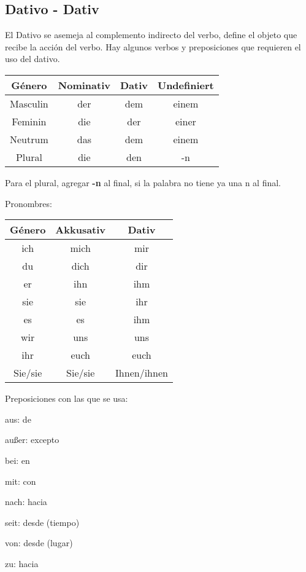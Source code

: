 \subsection{Dativo - Dativ}
El Dativo se asemeja al complemento indirecto del verbo, define el objeto que recibe la acción del verbo. Hay algunos verbos y preposiciones que requieren el uso del dativo.

\begin{tabular}{|c | c | c | c |}
\hline
\textbf{Género} & \textbf{Nominativ} & \textbf{Dativ} & \textbf{Undefiniert}\\
\hline
Masculin & der & dem & einem  \\
Feminin & die &  der & einer \\
Neutrum & das & dem & einem \\
Plural & die & den & -n \\
\hline
\end{tabular}

Para el plural, agregar \textbf{-n} al final, si la palabra no tiene ya una n al final.

Pronombres:

\begin{tabular}{|c | c | c |}
\hline
\textbf{Género} & \textbf{Akkusativ} & \textbf{Dativ} \\
\hline
ich & mich & mir \\
du & dich & dir \\
er & ihn & ihm \\
sie & sie & ihr \\
es & es & ihm \\
wir & uns & uns \\
ihr & euch & euch \\
Sie/sie & Sie/sie & Ihnen/ihnen \\
\hline
\end{tabular}

Preposiciones con las que se usa:
\begin{multicols}{3}
\begin{myitemize}
\item aus: de
\item außer: excepto
\item bei: en
\item mit: con
\item nach: hacia
\item seit: desde (tiempo)
\item von: desde (lugar)
\item zu: hacia
\end{myitemize}
\end{multicols}


